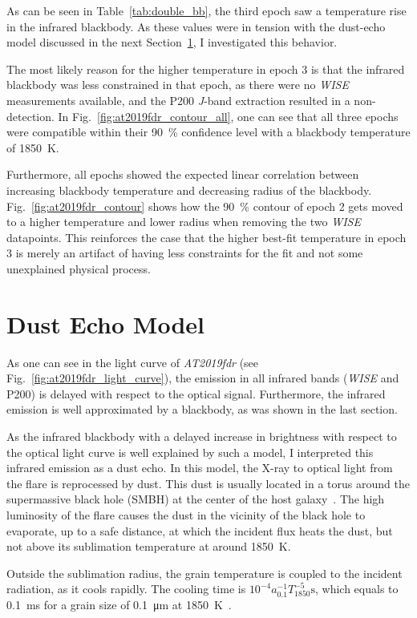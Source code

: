As can be seen in Table~\ref{tab:double_bb}, the third epoch saw a temperature rise in the infrared blackbody. As these values were in tension with the dust-echo model discussed in the next Section~\ref{dust_echo}, I investigated this behavior.

The most likely reason for the higher temperature in epoch 3 is that the infrared blackbody was less constrained in that epoch, as there were no \textit{WISE} measurements available, and the P200 \textit{J}-band extraction resulted in a non-detection. In Fig.~\ref{fig:at2019fdr_contour_all}, one can see that all three epochs were compatible within their \SI{90}{\percent} confidence level with a blackbody temperature of \SI{1850}{\K}.

Furthermore, all epochs showed the expected linear correlation between increasing blackbody temperature and decreasing radius of the blackbody. Fig.~\ref{fig:at2019fdr_contour} shows how the \SI{90}{\percent} contour of epoch 2 gets moved to a higher temperature and lower radius when removing the two \textit{WISE} datapoints. This reinforces the case that the higher best-fit temperature in epoch 3 is merely an artifact of having less constraints for the fit and not some unexplained physical process.

\section{Dust Echo Model}\label{dust_echo}
As one can see in the light curve of \emph{AT2019fdr} (see Fig.~\ref{fig:at2019fdr_light_curve}), the emission in all infrared bands (\textit{WISE} and P200) is delayed with respect to the optical signal. Furthermore, the infrared emission is well approximated by a blackbody, as was shown in the last section.

As the infrared blackbody with a delayed increase in brightness with respect to the optical light curve is well explained by such a model, I interpreted this infrared emission as a dust echo. In this model, the X-ray to optical light from the flare is reprocessed by dust. This dust is usually located in a torus around the supermassive black hole (SMBH) at the center of the host galaxy~. The high luminosity of the flare causes the dust in the vicinity of the black hole to evaporate, up to a safe distance, at which the incident flux heats the dust, but not above its sublimation temperature at around \SI{1850}{\K}.

Outside the sublimation radius, the grain temperature is coupled to the incident radiation, as it cools rapidly. The cooling time is $10^{-4} a_{0.1}^{-1}T_{1850}^{-5}\unit{\s}$, which equals to \SI{0.1}{\milli\s} for a grain size of \SI{0.1}{\micro\m} at \SI{1850}{\K}~\cite{Velzen2016}.

